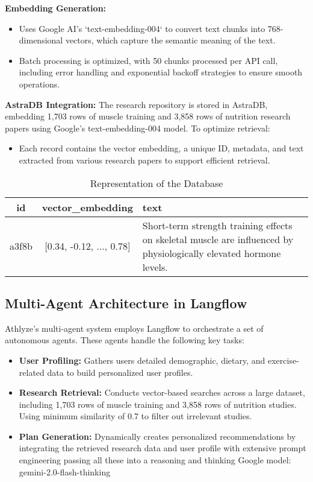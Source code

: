 \documentclass[conference]{IEEEtran}
\begin{document}
\textbf{Embedding Generation:}
\begin{itemize}
    \item Uses Google AI's `text-embedding-004` to convert text chunks into 768-dimensional vectors, which capture the semantic meaning of the text.
    \item Batch processing is optimized, with 50 chunks processed per API call, including error handling and exponential backoff strategies to ensure smooth operations.
\end{itemize}

\textbf{AstraDB Integration:}
The research repository is stored in AstraDB, embedding 1,703 rows of muscle training and 3,858 rows of nutrition research papers using Google's text-embedding-004 model. To optimize retrieval:
\begin{itemize}
    \item Each record contains the vector embedding, a unique ID, metadata, and text extracted from various research papers to support efficient retrieval.
\end{itemize}

\begin{table}[h]
    \caption{Representation of the Database}
    \centering
    \small %
    \begin{tabular}{|c|c|p{2.4cm}|}
        \hline
        \textbf{id} & \textbf{vector\_embedding} &  \textbf{text} \\
        \hline
        a3f8b & [0.34, -0.12, ..., 0.78] & Short-term strength training effects on skeletal muscle are influenced by physiologically elevated hormone levels. \\
        \hline
    \end{tabular}
\end{table}

\subsection{Multi-Agent Architecture in Langflow}
Athlyze's multi-agent system employs Langflow to orchestrate a set of autonomous agents. These agents handle the following key tasks:

\begin{itemize}
    \item \textbf{User Profiling:} Gathers users detailed demographic, dietary, and exercise-related data to build personalized user profiles.
    \item \textbf{Research Retrieval:} Conducts vector-based searches across a large dataset, including 1,703 rows of muscle training and 3,858 rows of nutrition studies. Using minimum similarity of 0.7 to filter out irrelevant studies.
    \item \textbf{Plan Generation:} Dynamically creates personalized recommendations by integrating the retrieved research data and user profile with extensive prompt engineering passing all these into a reasoning and thinking Google model: gemini-2.0-flash-thinking
\end{itemize}
\end{document}
